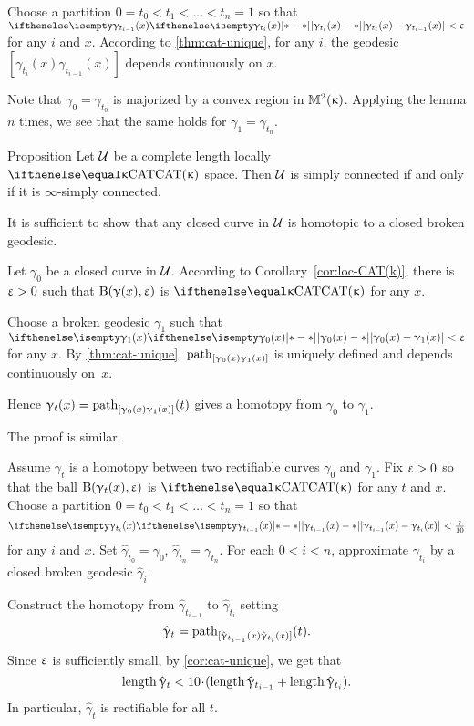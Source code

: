 Choose a partition $0=t_0<t_1<\dots<t_n=1$
so that $\dist{\gamma_{t_i}(x)}{\gamma_{t_{i-1}}(x)}{}<\eps$
for any $i$ and $x$.
According to \ref{thm:cat-unique},
for any $i$,
the geodesic $[\gamma_{t_i}(x)\gamma_{t_{i-1}}(x)]$ depends continuously on $x$.

Note that $\gamma_0=\gamma_{t_0}$ is majorized by a convex region in $\mathbb{M}_{{}}^{2}({\upkappa})$.
Applying the lemma $n$ times, we see that the same holds for $\gamma_1=\gamma_{t_n}$.\qeds

\begin{thm}{Proposition}\label{prop:sc}
Let $\mathcal{U}$ be a complete length locally $\CAT\kappa$ space.
Then $\mathcal{U}$ is simply connected if and only if it is $\infty$-simply connected.
\end{thm}

It is sufficient to show that any closed curve in $\mathcal{U}$ is homotopic to a closed broken geodesic.

Let $\gamma_0$ be a closed curve in $\mathcal{U}$.
According to Corollary~\ref{cor:loc-CAT(k)},
there is $\upvarepsilon>0$ such that 
$\mathrm{B}{}(\upgamma(x),\upvarepsilon)$ is $\CAT\kappa$
for any $x$.

Choose a broken geodesic $\gamma_1$ such that $\dist{\gamma_0(x)}{\gamma_1(x)}{}<\eps$ for any $x$.
By \ref{thm:cat-unique}, 
$\mathrm{path}_{[\upgamma_0(x)\upgamma_1(x)]}$ 
is uniquely defined 
and depends continuously on~$x$.

Hence $\upgamma_t(x)=\mathrm{path}_{[\upgamma_0(x)\upgamma_1(x)]}(t)$ gives a homotopy from $\gamma_0$ to $\gamma_1$.

 The proof is similar.

Assume $\gamma_t$ is a homotopy between two rectifiable curves $\gamma_0$ and $\gamma_1$.
Fix $\upvarepsilon>0$ so that the ball $\mathrm{B}{}(\upgamma_t(x),\upvarepsilon)$ is $\CAT\kappa$
for any $t$ and $x$.
Choose a partition $0=t_0<t_1<\dots<t_n=1$ 
so that 
$$\dist{\gamma_{t_{i-1}}(x)}{\gamma_{t_i}(x)}{}<\tfrac\eps{10}$$
for any $i$ and $x$.
Set $\hat\gamma_{t_0}=\gamma_0$, $\hat\gamma_{t_n}=\gamma_{t_n}$.
For each $0<i<n$, approximate $\gamma_{t_i}$ by a closed broken geodesic $\hat\gamma_{i}$.

Construct the homotopy 
from $\hat\gamma_{t_{i-1}}$ 
to $\hat\gamma_{t_i}$ 
setting 
$$\hat{\upgamma}_t
=
\mathrm{path}_{[\hat{\upgamma}_{t_{i-1}}(x)\hat{\upgamma}_{t_i}(x)]}(t).$$
Since $\upvarepsilon$ is sufficiently small, 
by \ref{cor:cat-unique}, we get that
$$\length\hat\gamma_t
<
10\cdot(\length\hat\gamma_{t_{i-1}}+\length\hat\gamma_{t_i}).$$
In particular, $\hat\gamma_t$ is rectifiable for all $t$.

